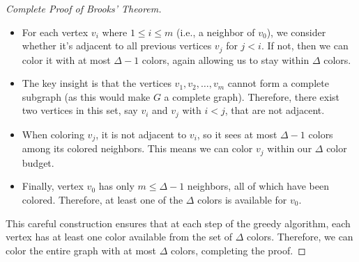 \documentclass{article}
\theoremstyle{definition}
\begin{document}
\begin{proof}[Complete Proof of Brooks' Theorem]
\begin{itemize}
    \item For each vertex $v_i$ where $1 \leq i \leq m$ (i.e., a neighbor of $v_0$), we consider whether it's adjacent to all previous vertices $v_j$ for $j < i$. If not, then we can color it with at most $\Delta-1$ colors, again allowing us to stay within $\Delta$ colors.
    
    \item The key insight is that the vertices $v_1, v_2, \ldots, v_m$ cannot form a complete subgraph (as this would make $G$ a complete graph). Therefore, there exist two vertices in this set, say $v_i$ and $v_j$ with $i < j$, that are not adjacent.
    
    \item When coloring $v_j$, it is not adjacent to $v_i$, so it sees at most $\Delta-1$ colors among its colored neighbors. This means we can color $v_j$ within our $\Delta$ color budget.
    
    \item Finally, vertex $v_0$ has only $m \leq \Delta-1$ neighbors, all of which have been colored. Therefore, at least one of the $\Delta$ colors is available for $v_0$.
\end{itemize}

This careful construction ensures that at each step of the greedy algorithm, each vertex has at least one color available from the set of $\Delta$ colors. Therefore, we can color the entire graph with at most $\Delta$ colors, completing the proof.
\end{proof}
\end{document}
